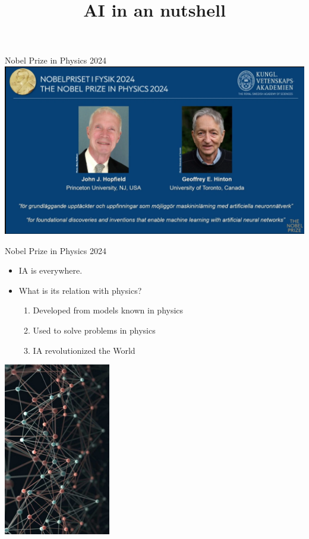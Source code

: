 \documentclass{beamer}
\title{\textbf{AI in an nutshell}}
\subtitle{}
\date{}
\begin{document}
\maketitle

\begin{frame}{Nobel Prize in Physics 2024}
\centering
        \includegraphics[scale=0.27]{pics/HINTON_HOPFIELD.png}
\end{frame}

\begin{frame}{Nobel Prize in Physics 2024}
\begin{multicols}{2}
\begin{itemize}
    \item IA is everywhere. 
    \item What is its relation with physics?
    \begin{enumerate}
    \item  Developed from models known in physics
    \item  Used to solve problems in physics
    \item  IA revolutionized the World
\end{enumerate}
\end{itemize}


\columnbreak

\centering
\includegraphics[width=0.35\textwidth]{pics/neurons.jpeg}
    



\end{multicols}

\end{frame}
\end{document}
